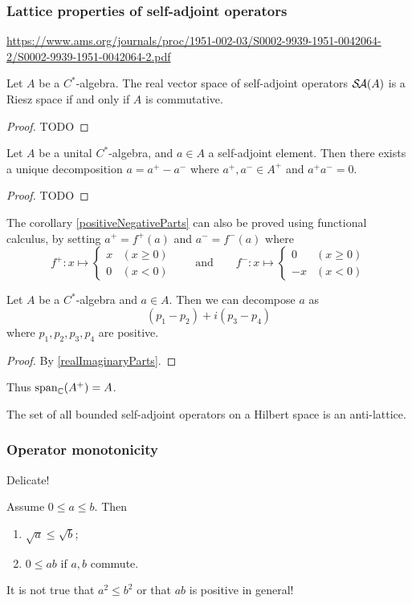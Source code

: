 \subsubsection{Lattice properties of self-adjoint operators}
\url{https://www.ams.org/journals/proc/1951-002-03/S0002-9939-1951-0042064-2/S0002-9939-1951-0042064-2.pdf}

\begin{proposition}
Let $A$ be a $C^*$-algebra. The real vector space of self-adjoint operators $\mathop{\mathcal{S}\hspace{-0.15em}\mathcal{A}}\nolimits(A)$ is a Riesz space \textup{if and only if} $A$ is commutative.
\end{proposition}
\begin{proof}
TODO
\end{proof}
\begin{corollary} \label{positiveNegativeParts}
Let $A$ be a unital $C^*$-algebra, and $a\in A$ a self-adjoint element. Then there exists a unique decomposition $a=a^+ - a^-$ where $a^+,a^-\in A^+$ and $a^+a^- = 0$.
\end{corollary}
\begin{proof}
TODO
\end{proof}
The corollary \ref{positiveNegativeParts} can also be proved using functional calculus, by setting $a^+ = f^+(a)$ and $a^- = f^-(a)$ where
\[ f^+: x\mapsto \begin{cases}
x & (x\geq 0)\\ 0 & (x < 0)
\end{cases} \qquad\text{and}\qquad f^-: x\mapsto \begin{cases}
0 & (x\geq 0)\\ -x & (x < 0)
\end{cases} \]

\begin{corollary}
Let $A$ be a $C^*$-algebra and $a\in A$. Then we can decompose $a$ as
\[ (p_1-p_2) + i(p_3-p_4) \]
where $p_1,p_2,p_3,p_4$ are positive.
\end{corollary}
\begin{proof}
By \ref{realImaginaryParts}.
\end{proof}
Thus $\operatorname{span}_{\mathbb{C}}(A^+) = A$.

\begin{proposition}
The set of all bounded self-adjoint operators on a Hilbert space is an anti-lattice.
\end{proposition}

\subsubsection{Operator monotonicity}
Delicate!
\begin{proposition}
Assume $0\leq a\leq b$. Then
\begin{enumerate}
\item $\sqrt{a}\leq \sqrt{b}$;
\item $0\leq ab$ if $a,b$ commute.
\end{enumerate}
\end{proposition}
It is not true that $a^2\leq b^2$ or that $ab$ is positive in general!

